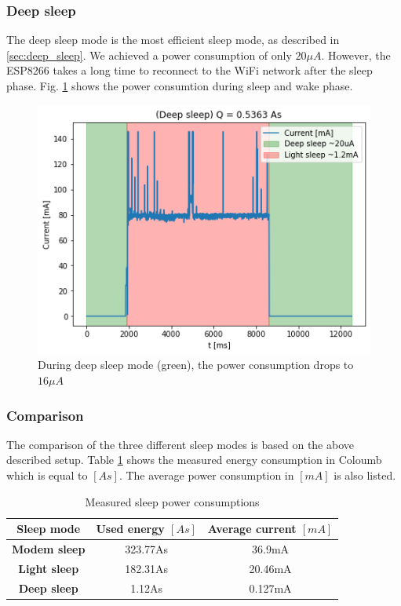 \subsubsection{Deep sleep}
The deep sleep mode is the most efficient sleep mode, as described in \ref{sec:deep_sleep}. 
We achieved a power consumption of only $20 \mu A$. 
However, the ESP8266 takes a long time to reconnect to the WiFi network after the sleep phase.
Fig. \ref{fig:deep_sleep} shows the power consumtion during sleep and wake phase.
\begin{figure}[h]
    \includegraphics[width = \linewidth]{fig/deep_sleep.png}
    \caption{During deep sleep mode (green), the power consumption drops to $16 \mu A$}
    \label{fig:deep_sleep}
\end{figure}

\subsubsection{Comparison}
The comparison of the three different sleep modes is based on the above described setup.
Table \ref{tab:sleep_modes_15min} shows the measured energy consumption in Coloumb which is equal to $[As]$.
The average power consumption in $[mA]$ is also listed.

\begin{table}[htbp]
\caption{Measured sleep power consumptions}
\begin{center}
\begin{tabular}{|c|c|c|}
\hline
\textbf{Sleep mode}&\textbf{Used energy $[As]$}&\textbf{Average current $[mA]$}\\
\hline
\textbf{Modem sleep} & 323.77As & 36.9mA\\
\textbf{Light sleep} & 182.31As & 20.46mA\\
\textbf{Deep sleep}  & 1.12As   & 0.127mA\\
\hline
\end{tabular}
\label{tab:sleep_modes_15min}
\end{center}
\end{table}

